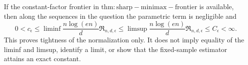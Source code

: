 If the constant-factor frontier in \(\mathrm{thm:sharp-minimax-frontier}\) is available, then along the sequences in the question the parametric term is negligible and
\[
 0<c_\epsilon
 \le \liminf\frac{n\log(en)}d\mathfrak R_{n,d,\epsilon}
 \le \limsup\frac{n\log(en)}d\mathfrak R_{n,d,\epsilon}
 \le C_\epsilon<\infty.
\]
This proves tightness of the normalization only.  It does not imply equality of the liminf and limsup, identify a limit, or show that the fixed-sample estimator attains an exact constant.